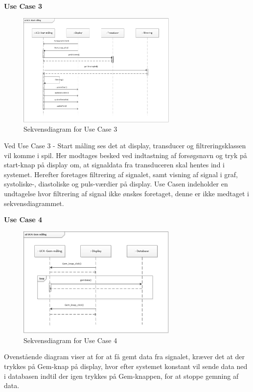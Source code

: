 \textbf{Use Case 3}
\begin{figure}[H]
	\centering
	\includegraphics[width=0.7\textwidth]{Figurer/UC3}
	\caption{Sekvensdiagram for Use Case 3}
\end{figure}
Ved Use Case 3 - Start måling ses det at display, transducer og filtreringsklassen vil komme i spil. Her modtages besked ved indtastning af forsøgsnavn og tryk på start-knap på display om, at signaldata fra transduceren skal hentes ind i systemet. Herefter foretages filtrering af signalet, samt visning af signal i graf, systoliske-, diastoliske og puls-værdier på display. Use Casen indeholder en undtagelse hvor filtrering af signal ikke ønskes foretaget, denne er ikke medtaget i sekvensdiagrammet.

\textbf{Use Case 4}
\begin{figure}[H]
	\centering
	\includegraphics[width=0.7\textwidth]{Figurer/UC4}
	\caption{Sekvensdiagram for Use Case 4}
\end{figure}
Ovenstående diagram viser at for at få gemt data fra signalet, kræver det at der trykkes på Gem-knap på display, hvor efter systemet konstant vil sende data ned i databasen indtil der igen trykkes på Gem-knappen, for at stoppe gemning af data. 

